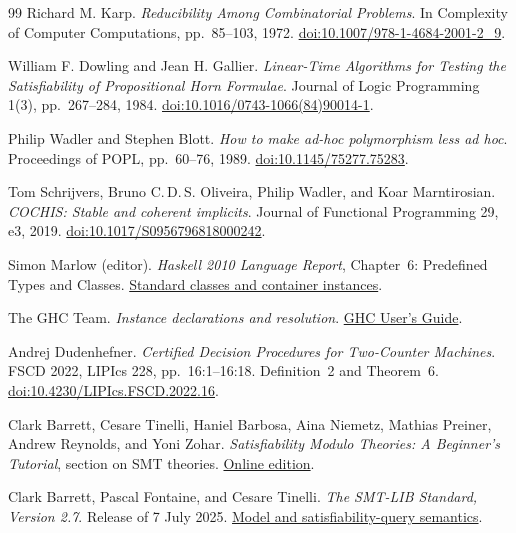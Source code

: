 \documentclass[10pt,a4paper]{article}
\begin{document}
\newpage
\begin{thebibliography}{99}
Richard M. Karp.
\emph{Reducibility Among Combinatorial Problems}.
In Complexity of Computer Computations, pp.~85--103, 1972.
\href{https://doi.org/10.1007/978-1-4684-2001-2_9}{doi:10.1007/978-1-4684-2001-2\_9}.

William F. Dowling and Jean H. Gallier.
\emph{Linear-Time Algorithms for Testing the Satisfiability of Propositional Horn Formulae}.
Journal of Logic Programming 1(3), pp.~267--284, 1984.
\href{https://doi.org/10.1016/0743-1066(84)90014-1}{doi:10.1016/0743-1066(84)90014-1}.

Philip Wadler and Stephen Blott.
\emph{How to make ad-hoc polymorphism less ad hoc}.
Proceedings of POPL, pp.~60--76, 1989.
\href{https://doi.org/10.1145/75277.75283}{doi:10.1145/75277.75283}.

Tom Schrijvers, Bruno C.\,D.\,S. Oliveira, Philip Wadler, and Koar Marntirosian.
\emph{COCHIS: Stable and coherent implicits}.
Journal of Functional Programming 29, e3, 2019.
\href{https://doi.org/10.1017/S0956796818000242}{doi:10.1017/S0956796818000242}.

Simon Marlow (editor).
\emph{Haskell 2010 Language Report}, Chapter~6: Predefined Types and Classes.
\href{https://www.haskell.org/onlinereport/haskell2010/haskellch6.html}{Standard classes and container instances}.

The GHC Team.
\emph{Instance declarations and resolution}.
\href{https://ghc.gitlab.haskell.org/ghc/doc/users_guide/exts/instances.html}
 {GHC User's Guide}.

Andrej Dudenhefner.
\emph{Certified Decision Procedures for Two-Counter Machines}.
FSCD 2022, LIPIcs 228, pp.~16:1--16:18. Definition~2 and Theorem~6.
\href{https://doi.org/10.4230/LIPIcs.FSCD.2022.16}{doi:10.4230/LIPIcs.FSCD.2022.16}.

Clark Barrett, Cesare Tinelli, Haniel Barbosa, Aina Niemetz, Mathias Preiner,
Andrew Reynolds, and Yoni Zohar.
\emph{Satisfiability Modulo Theories: A Beginner's Tutorial}, section on SMT theories.
\href{https://cvc5.github.io/tutorials/beginners/theories.html}{Online edition}.

Clark Barrett, Pascal Fontaine, and Cesare Tinelli.
\emph{The SMT-LIB Standard, Version 2.7}. Release of 7 July 2025.
\href{https://smt-lib.org/papers/smt-lib-reference-v2.7-r2025-07-07.pdf}{Model and satisfiability-query semantics}.


\end{thebibliography}
\end{document}
